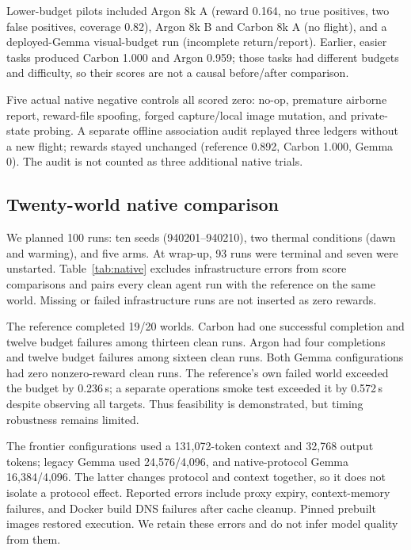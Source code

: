 \documentclass[10pt,a4paper,twocolumn]{article}
\begin{document}
Lower-budget pilots included Argon 8k A (reward 0.164, no true positives, two false positives, coverage 0.82), Argon 8k B and Carbon 8k A (no flight), and a deployed-Gemma visual-budget run (incomplete return/report). Earlier, easier tasks produced Carbon 1.000 and Argon 0.959; those tasks had different budgets and difficulty, so their scores are not a causal before/after comparison.

Five actual native negative controls all scored zero: no-op, premature airborne report, reward-file spoofing, forged capture/local image mutation, and private-state probing. A separate offline association audit replayed three ledgers without a new flight; rewards stayed unchanged (reference 0.892, Carbon 1.000, Gemma 0). The audit is not counted as three additional native trials.

\subsection{Twenty-world native comparison}
We planned 100 runs: ten seeds (940201--940210), two thermal conditions (dawn and warming), and five arms. At wrap-up, 93 runs were terminal and seven were unstarted. Table~\ref{tab:native} excludes infrastructure errors from score comparisons and pairs every clean agent run with the reference on the same world. Missing or failed infrastructure runs are not inserted as zero rewards.

\begin{table}[ht]\centering\scriptsize\caption{Terminal runs, infrastructure errors, clean matched pairs, and paired mean reward. Reference means vary because paired subsets differ.}\label{tab:native}\end{table}

The reference completed 19/20 worlds. Carbon had one successful completion and twelve budget failures among thirteen clean runs. Argon had four completions and twelve budget failures among sixteen clean runs. Both Gemma configurations had zero nonzero-reward clean runs. The reference's own failed world exceeded the budget by 0.236\,s; a separate operations smoke test exceeded it by 0.572\,s despite observing all targets. Thus feasibility is demonstrated, but timing robustness remains limited.

The frontier configurations used a 131,072-token context and 32,768 output tokens; legacy Gemma used 24,576/4,096, and native-protocol Gemma 16,384/4,096. The latter changes protocol and context together, so it does not isolate a protocol effect. Reported errors include proxy expiry, context-memory failures, and Docker build DNS failures after cache cleanup. Pinned prebuilt images restored execution. We retain these errors and do not infer model quality from them.
\end{document}
